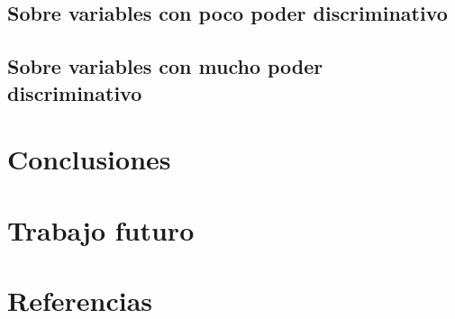 \documentclass[]{article}
\begin{document}
\subsection{Sobre variables con poco poder discriminativo}

\subsection{Sobre variables con mucho poder discriminativo}

\section*{Conclusiones}

\section*{Trabajo futuro}



\section*{Referencias}
\end{document}

